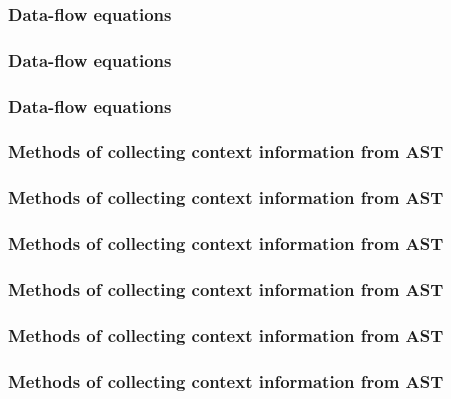 \documentclass[presentation]{beamer}
\begin{document}
\begin{frame}
  \frametitle{Data-flow equations}
  
\end{frame}

\begin{frame}
  \frametitle{Data-flow equations}
  
\end{frame}

\begin{frame}
  \frametitle{Data-flow equations}
  
\end{frame}

\begin{frame}
  \frametitle{Methods of collecting context information from AST}
  
\end{frame}

\begin{frame}
  \frametitle{Methods of collecting context information from AST}
  
\end{frame}

\begin{frame}
  \frametitle{Methods of collecting context information from AST}
  
\end{frame}

\begin{frame}
  \frametitle{Methods of collecting context information from AST}
  
\end{frame}

\begin{frame}
  \frametitle{Methods of collecting context information from AST}
  
\end{frame}

\begin{frame}
  \frametitle{Methods of collecting context information from AST}
  
\end{frame}
\end{document}
